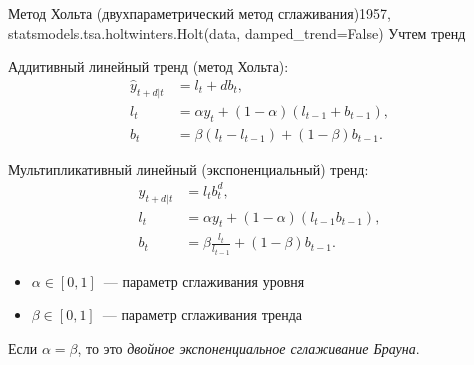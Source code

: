 \documentclass[10pt,pdf,utf8,hyperref={unicode},aspectratio=169]{beamer}
\begin{document}
\begin{frame}{Метод Хольта (двухпараметрический метод сглаживания)}{1957, statsmodels.tsa.holtwinters.Holt(data, damped\_trend=False)}
	 Учтем тренд

	\begin{multicols}{2}

		Аддитивный линейный тренд (метод Хольта):
		\begin{align*}
		\hat{y}_{t+d|t} &= l_t + d b_t, \\
		l_{t}       &= \alpha y_t + \left(1-\alpha\right) \left(l_{t-1} + b_{t-1}\right), \\
		b_t         &= \beta \left(l_t - l_{t-1}\right) + \left(1-\beta\right) b_{t-1}.
		\end{align*}
		
		\columnbreak
		
		Мультипликативный линейный (экспоненциальный) тренд:
		\begin{align*}
		\hat{y}_{t+d|t} &= l_tb_t^d, \\
		l_{t}       &= \alpha y_t + \left(1-\alpha\right) \left(l_{t-1} b_{t-1}\right), \\
		b_t         &= \beta \frac{l_t}{l_{t-1}} + \left(1-\beta\right) b_{t-1}.
		\end{align*}
	\end{multicols}
		\bigskip
		
		\bigskip
		\begin{itemize}
			\item $\alpha \in \left[0,1\right]$~--- параметр сглаживания уровня
			\item $\beta \in \left[0,1\right]$~--- параметр сглаживания тренда
		\end{itemize}
		


Если $\alpha=\beta$, то это \emph{двойное экспоненциальное сглаживание Брауна}.

\end{frame}
\end{document}
